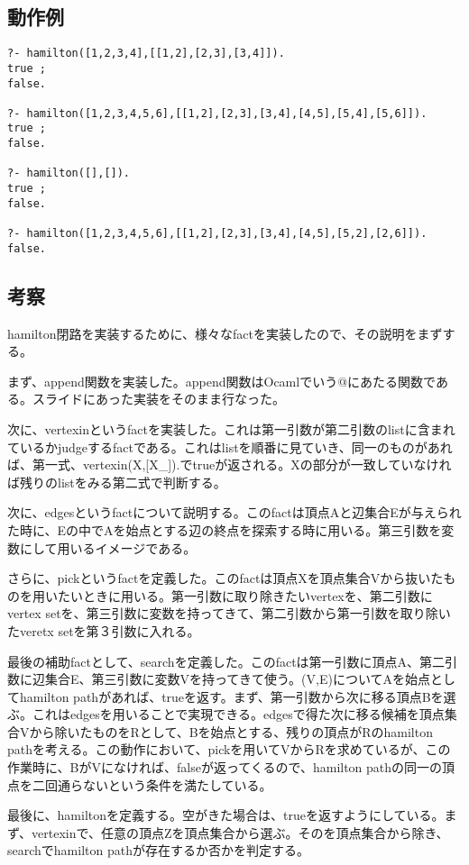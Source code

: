 \documentclass[uplatex,12pt]{jsarticle}
\begin{document}
\subsection{動作例}
\begin{lstlisting}[caption=動作例]
?- hamilton([1,2,3,4],[[1,2],[2,3],[3,4]]).
true ;
false.

?- hamilton([1,2,3,4,5,6],[[1,2],[2,3],[3,4],[4,5],[5,4],[5,6]]).
true ;
false.

?- hamilton([],[]).
true ;
false.

?- hamilton([1,2,3,4,5,6],[[1,2],[2,3],[3,4],[4,5],[5,2],[2,6]]).
false.

\end{lstlisting}
\subsection{考察}
hamilton閉路を実装するために、様々なfactを実装したので、その説明をまずする。

まず、append関数を実装した。append関数はOcamlでいう@にあたる関数である。スライドにあった実装をそのまま行なった。

次に、vertexinというfactを実装した。これは第一引数が第二引数のlistに含まれているかjudgeするfactである。これはlistを順番に見ていき、同一のものがあれば、第一式、vertexin(X,[X\mid\_]).でtrueが返される。Xの部分が一致していなければ残りのlistをみる第二式で判断する。

次に、edgesというfactについて説明する。このfactは頂点Aと辺集合Eが与えられた時に、Eの中でAを始点とする辺の終点を探索する時に用いる。第三引数を変数にして用いるイメージである。

さらに、pickというfactを定義した。このfactは頂点Xを頂点集合Vから抜いたものを用いたいときに用いる。第一引数に取り除きたいvertexを、第二引数にvertex setを、第三引数に変数を持ってきて、第二引数から第一引数を取り除いたveretx setを第３引数に入れる。

最後の補助factとして、searchを定義した。このfactは第一引数に頂点A、第二引数に辺集合E、第三引数に変数Vを持ってきて使う。(V,E)についてAを始点としてhamilton pathがあれば、trueを返す。まず、第一引数から次に移る頂点Bを選ぶ。これはedgesを用いることで実現できる。edgesで得た次に移る候補を頂点集合Vから除いたものをRとして、Bを始点とする、残りの頂点がRのhamilton pathを考える。この動作において、pickを用いてVからRを求めているが、この作業時に、BがVになければ、falseが返ってくるので、hamilton pathの同一の頂点を二回通らないという条件を満たしている。

最後に、hamiltonを定義する。空がきた場合は、trueを返すようにしている。まず、vertexinで、任意の頂点Zを頂点集合から選ぶ。そのを頂点集合から除き、searchでhamilton pathが存在するか否かを判定する。
\end{document}
